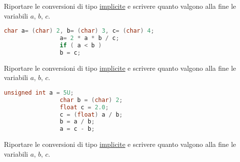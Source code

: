 \documentclass[addpoints,11pt]{exam}
\begin{document}
	\boxedpoints
	\begin{center}
	\end{center}
	
	\vspace{5mm}
	
	\noindent{}
	
	
	
	\begin{questions} 
		
		\question[1]
		Riportare le conversioni di tipo \underline{implicite} e scrivere quanto valgono alla fine le variabili $a$, $b$, $c$.
		
		\begin{minipage}[t]{0.5\linewidth}
			\begin{lstlisting}[language=C]
				char a= (char) 2, b= (char) 3, c= (char) 4;
				a= 2 * a * b / c;
				if ( a < b ) 
				b = c;
			\end{lstlisting}
		\end{minipage}
		\begin{minipage}[t]{0.5\linewidth}
			\makeemptybox{50pt}
		\end{minipage}
		
		
		
		\question[2]
		Riportare le conversioni di tipo \underline{implicite} e scrivere quanto valgono alla fine le variabili $a$, $b$, $c$.
		
		\begin{minipage}[t]{0.5\linewidth}
			\begin{lstlisting}[language=C]
				unsigned int a = 5U;
				char b = (char) 2;
				float c = 2.0;
				c = (float) a / b;
				b = a / b;
				a = c - b;
			\end{lstlisting}
		\end{minipage}
		\begin{minipage}[t]{0.5\linewidth}
			\makeemptybox{70pt}
		\end{minipage}
		
		
		
		\question[3]
		Riportare le conversioni di tipo \underline{implicite} e scrivere quanto valgono alla fine le variabili $a$, $b$, $c$.
		

\end{questions}
\end{document}
